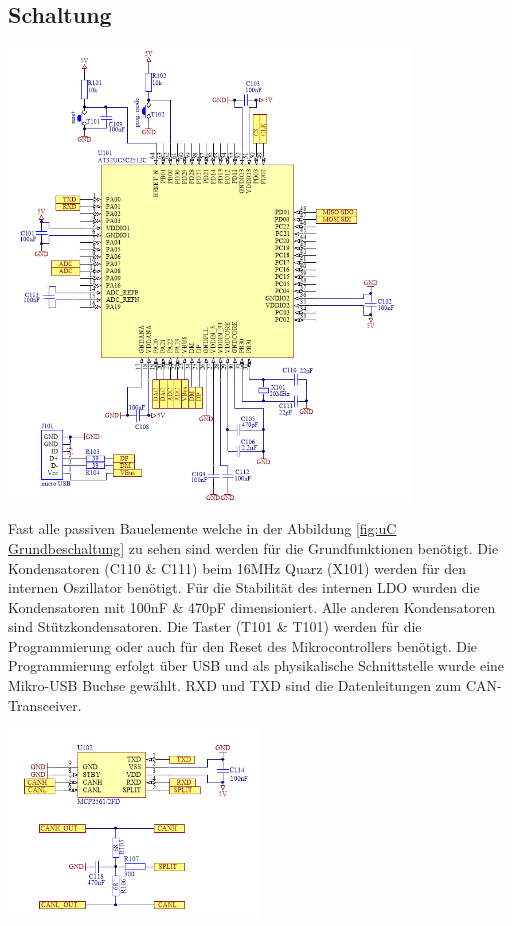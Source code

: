 \documentclass[paper=a4, 12pt]{scrreprt}
\begin{document}
		\subsection{Schaltung}
		\begin{adjustbox}{center,caption={Mikrocontroller Grundbeschaltung},label={fig:uC Grundbeschaltung},nofloat=figure,vspace=\bigskipamount}
			\includegraphics[height=12cm]{img/Grundbeschaltung_uC.PNG}
		\end{adjustbox}
	Fast alle passiven Bauelemente welche in der Abbildung \ref{fig:uC Grundbeschaltung} zu sehen sind werden für die Grundfunktionen benötigt. Die Kondensatoren (C110 \& C111) beim 16MHz Quarz (X101) werden für den internen Oszillator benötigt. Für die Stabilität des internen LDO wurden die Kondensatoren mit 100nF \& 470pF dimensioniert.
	Alle anderen Kondensatoren sind Stützkondensatoren. Die Taster (T101 \& T101) werden für die Programmierung oder auch für den Reset des Mikrocontrollers benötigt. Die Programmierung erfolgt über USB und als physikalische Schnittstelle wurde eine Mikro-USB Buchse gewählt. RXD und TXD sind die Datenleitungen zum CAN-Transceiver. 
		\begin{adjustbox}{center,caption={CAN-Transceiver},label={fig:CAN-Transceiver},nofloat=figure,vspace=\bigskipamount}
		\includegraphics[height=5cm]{img/CAN_Tranceiver.PNG}
		\end{adjustbox}
\end{document}
